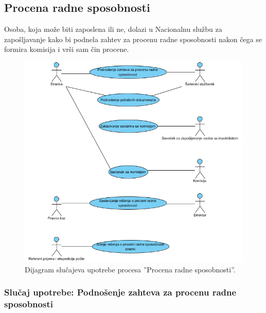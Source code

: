 \subsection{Procena radne sposobnosti}

Osoba, koja mo\v ze biti zaposlena ili ne, dolazi u Nacionalnu slu\v zbu za zapo\v sljavanje kako bi podnela zahtev za procenu radne sposobnosti nakon \v cega se formira komisija i vr\v si sam \v cin procene.

\begin{figure}[H]
	\centering
	\includegraphics[width=\textwidth]{dijagrami/dijagrami-slucajeva-upotrebe/procena-radne-sposobnosti.png}
	\caption{Dijagram slu\v cajeva upotrebe procesa ''Procena radne sposobnosti''.}
	\label{dsu: procena_radne_sposobnosti}
\end{figure}


\subsubsection{Slu\v caj upotrebe: Podno\v senje zahteva za procenu radne sposobnosti}

